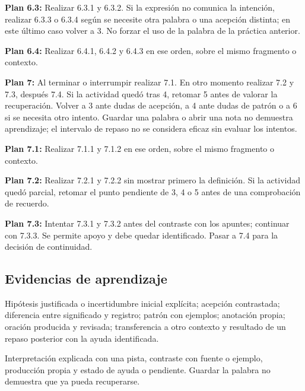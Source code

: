 \documentclass[10pt,a4paper]{article}
\begin{document}
\textbf{Plan 6.3:} Realizar 6.3.1 y 6.3.2. Si la expresión no comunica la intención, realizar 6.3.3 o 6.3.4 según se necesite otra palabra o una acepción distinta; en este último caso volver a 3. No forzar el uso de la palabra de la práctica anterior.\par
\textbf{Plan 6.4:} Realizar 6.4.1, 6.4.2 y 6.4.3 en ese orden, sobre el mismo fragmento o contexto.\par
\textbf{Plan 7:} Al terminar o interrumpir realizar 7.1. En otro momento realizar 7.2 y 7.3, después 7.4. Si la actividad quedó tras 4, retomar 5 antes de valorar la recuperación. Volver a 3 ante dudas de acepción, a 4 ante dudas de patrón o a 6 si se necesita otro intento. Guardar una palabra o abrir una nota no demuestra aprendizaje; el intervalo de repaso no se considera eficaz sin evaluar los intentos.\par
\textbf{Plan 7.1:} Realizar 7.1.1 y 7.1.2 en ese orden, sobre el mismo fragmento o contexto.\par
\textbf{Plan 7.2:} Realizar 7.2.1 y 7.2.2 sin mostrar primero la definición. Si la actividad quedó parcial, retomar el punto pendiente de 3, 4 o 5 antes de una comprobación de recuerdo.\par
\textbf{Plan 7.3:} Intentar 7.3.1 y 7.3.2 antes del contraste con los apuntes; continuar con 7.3.3. Se permite apoyo y debe quedar identificado. Pasar a 7.4 para la decisión de continuidad.\par
\subsection*{Evidencias de aprendizaje}
Hipótesis justificada o incertidumbre inicial explícita; acepción contrastada; diferencia entre significado y registro; patrón con ejemplos; anotación propia; oración producida y revisada; transferencia a otro contexto y resultado de un repaso posterior con la ayuda identificada.\par
Interpretación explicada con una pista, contraste con fuente o ejemplo, producción propia y estado de ayuda o pendiente. Guardar la palabra no demuestra que ya pueda recuperarse.\par
\end{document}
